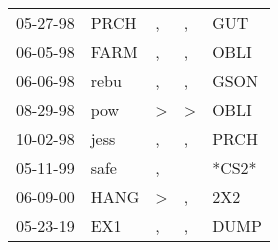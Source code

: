 \begin{supertabular}{lllll}
 05-27-98 &  PRCH &             , &             , &    GUT \\
 06-05-98 &  FARM &             , &             , &   OBLI \\
 06-06-98 &  rebu &             , &             , &   GSON \\
 08-29-98 &   pow &  \textgreater &  \textgreater &   OBLI \\
 10-02-98 &  jess &             , &             , &   PRCH \\
 05-11-99 &  safe &             , &               &  *CS2* \\
 06-09-00 &  HANG &  \textgreater &             , &    2X2 \\
 05-23-19 &   EX1 &             , &             , &   DUMP \\
\end{supertabular}
